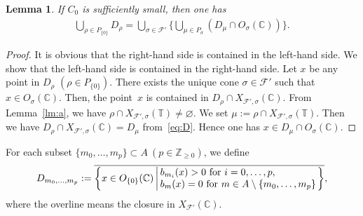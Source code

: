 \documentclass[10pt,a4paper]{amsart}
\numberwithin{equation}{section}
\newtheorem{Lemma}[Theorem]{Lemma}
\begin{document}
\begin{Lemma} If $C_0$ is sufficiently small, then one has
\begin{gather*}
\bigcup_{\rho \in P_{\{0\}}} D_\rho = \bigcup_{\sigma \in {\mathcal F}'} \bigg\{\bigcup_{\mu \in P_\sigma} (D_\mu \cap O_\sigma({\mathbb C})) \bigg\}.
\end{gather*}
\end{Lemma}

\begin{proof}
It is obvious that the right-hand side is contained in the left-hand side. We show that the left-hand side is contained in the right-hand side. Let $x$ be any point in $D_\rho$ $(\rho \in P_{\{0\}})$. There exists the unique cone $\sigma \in {\mathcal F}'$ such that $x \in O_\sigma({\mathbb C})$. Then, the point~$x$ is contained in $D_\rho \cap X_{{\mathcal F}',\sigma}({\mathbb C})$. From Lemma~\ref{lm:a}, we have $\rho \cap X_{{\mathcal F}',\sigma}({\mathbb T}) \neq \varnothing$. We set $\mu:=\rho \cap X_{{\mathcal F}',\sigma}({\mathbb T})$. Then we have $D_\rho \cap X_{{\mathcal F}',\sigma}({\mathbb C}) = D_\mu$ from~\eqref{eq:D}. Hence one has $x \in D_\mu \cap O_\sigma({\mathbb C})$.
\end{proof}

For each subset $\{m_0, \dots, m_p\} \subset A \ (p \in {\mathbb Z}_{\geq0})$, we def\/ine
\begin{gather*}
D_{m_0, \dots, m_p}:=
\overline{
\left\{ x \in O_{\{0\}}({\mathbb C}) \left|\,
\begin{array}{@{}l@{}}
b_{m_i}(x)>0\ {\rm for\ } i=0, \dots, p,\\
b_{m}(x)=0\ {\rm for\ } m \in A \setminus \{m_0, \dots, m_{p}\}\\
\end{array}
\right.\right\}
},
\end{gather*}
where the overline means the closure in $X_{{\mathcal F}'}({\mathbb C})$.
\end{document}

